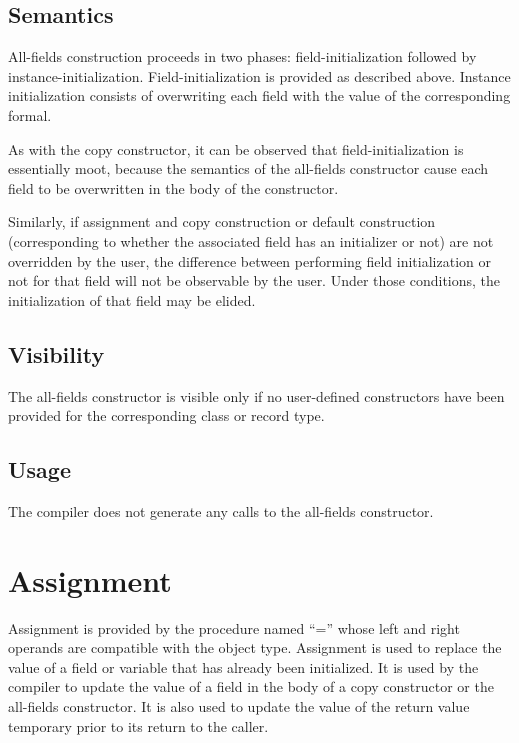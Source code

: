 \subsection{Semantics}

All-fields construction proceeds in two phases: field-initialization followed by
instance-initialization.  Field-initialization is provided as described above.
Instance initialization consists of overwriting each field with the value of the
corresponding formal.

\begin{note}

As with the copy constructor, it can be observed that field-initialization is
essentially moot, because the semantics of the all-fields constructor cause each
field to be overwritten in the body of the constructor.

Similarly, if assignment and copy construction or default construction
(corresponding to whether the associated field has an initializer or not) are
not overridden by the user, the difference between performing field
initialization or not for that field will not be observable by the user.  Under
those conditions, the initialization of that field may be elided.

\end{note}

\subsection{Visibility}

The all-fields constructor is visible only if no user-defined constructors have
been provided for the corresponding class or record type.

\subsection{Usage}

The compiler does not generate any calls to the all-fields constructor.

\section{Assignment}

Assignment is provided by the procedure named ``='' whose left and right
operands are compatible with the object type.  Assignment is used to replace the
value of a field or variable that has already been initialized.  It is used by
the compiler to update the value of a field in the body of a copy constructor or
the all-fields constructor.  It is also used to update the value of the return
value temporary prior to its return to the caller.

